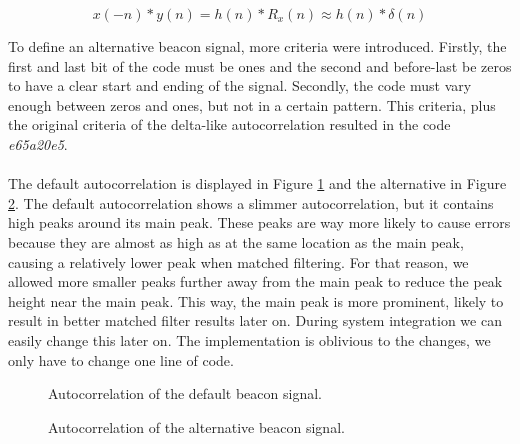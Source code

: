 \documentclass[final]{scrreprt} %
\begin{document}
\begin{equation}
	x(-n) * y(n) = h(n) * R_x(n) \approx h(n) * \delta (n)
	\label{eq:matchedf}
\end{equation}

To define an alternative beacon signal, more criteria were introduced.
Firstly, the first and last bit of the code must be ones and the second and before-last be zeros to have a clear start and ending of the signal.
Secondly, the code must vary enough between zeros and ones, but not in a certain pattern.
This criteria, plus the original criteria of the delta-like autocorrelation resulted in the code \emph{e65a20e5}.
\\ \\
The default autocorrelation is displayed in Figure \ref{fig:default-correlation} and the alternative in Figure \ref{fig:own-correlation}.
The default autocorrelation shows a slimmer autocorrelation, but it contains high peaks around its main peak.
These peaks are way more likely to cause errors because they are almost as high as at the same location as the main peak, causing a relatively lower peak when matched filtering.
For that reason, we allowed more smaller peaks further away from the main peak to reduce the peak height near the main peak.
This way, the main peak is more prominent, likely to result in better matched filter results later on.
During system integration we can easily change this later on.
The implementation is oblivious to the changes, we only have to change one line of code.

\begin{figure}[H]
	\centering
	\setlength\figureheight{4cm}
    	\setlength{}
	
	\caption{Autocorrelation of the default beacon signal.}
	\label{fig:default-correlation}
\end{figure}

\begin{figure}[H]
	\centering
	\setlength\figureheight{4cm}
    	\setlength{}
	
	\caption{Autocorrelation of the alternative beacon signal.}
	\label{fig:own-correlation}
\end{figure}
\end{document}
